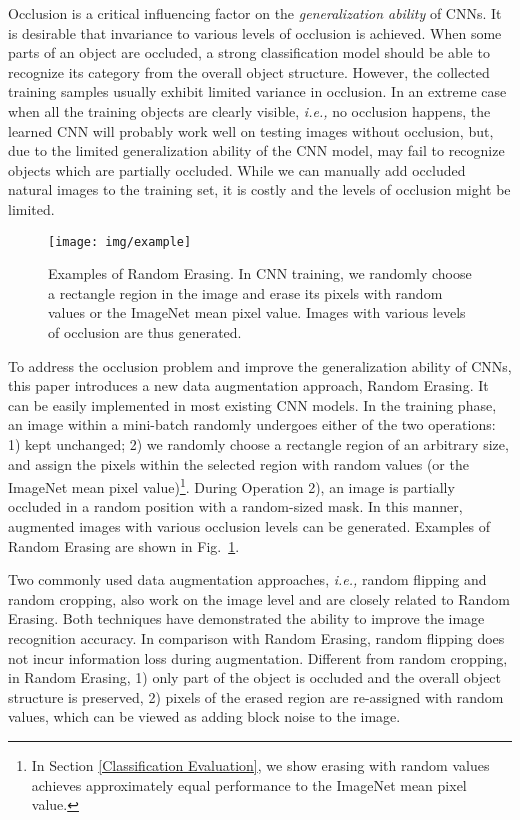 \documentclass[10pt,twocolumn,letterpaper]{article}
\begin{document}
Occlusion is a critical influencing factor on the \emph{generalization ability} of CNNs. It is desirable that invariance to various levels of occlusion is achieved. When some parts of an object are occluded, a strong classification model should be able to recognize its category from the overall object structure. However, the collected training samples usually exhibit limited variance in occlusion. 
In an extreme case when all the training objects are clearly visible, \emph{i.e.,} no occlusion happens, the learned CNN will probably work well on testing images without occlusion, but, due to the limited generalization ability of the CNN model, may fail to recognize objects which are partially occluded.
    While we can manually add occluded natural images to the training set, it is costly and the levels of occlusion might be limited. 
    
\begin{figure}[t]
\centering
\texttt{[image: img/example]}
\caption{Examples of Random Erasing. In CNN training, we randomly choose a rectangle region in the image and erase its pixels with random values or the ImageNet mean pixel value. Images with various levels of occlusion are thus generated.}
\label{fig:example}
\end{figure}

To address the occlusion problem and improve the generalization ability of CNNs, this paper introduces a new data augmentation approach, Random Erasing. It can be easily implemented in most existing CNN models. In the training phase, an image within a mini-batch randomly undergoes either of the two operations: 1) kept unchanged; 2) we randomly choose a rectangle region of an arbitrary size, and assign the pixels within the selected region with random values (or the ImageNet \cite{deng2009imagenet} mean pixel value)\footnote{In Section \ref{Classification Evaluation}, we show erasing with random values achieves approximately equal performance to the ImageNet mean pixel value.}. During Operation 2), an image is partially occluded in a random position with a random-sized mask. 
In this manner, augmented images with various occlusion levels can be generated. Examples of Random Erasing are shown in Fig.~\ref{fig:example}. 
    
Two commonly used data augmentation approaches, \emph{i.e.,}  random flipping and random cropping, also work on the image level and are closely related to Random Erasing. Both techniques have demonstrated the ability to improve the image recognition accuracy. In comparison with Random Erasing, random flipping does not incur information loss during augmentation. Different from random cropping, in Random Erasing, 1) only part of the object is occluded and the overall object structure is preserved, 2)  pixels of the erased region are re-assigned with random values, which can be viewed as adding block noise to the image. 
\end{document}
